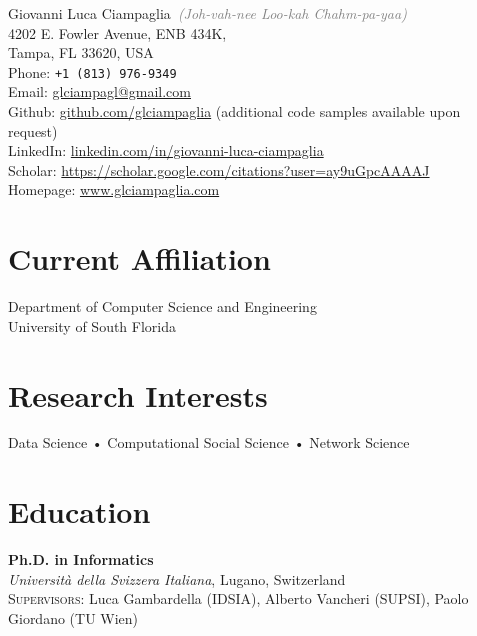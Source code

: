 \documentclass[10pt, letterpaper]{article}
\newcommand{\years}[1]{\marginnote{\small #1}}
\begin{document}
{\LARGE Giovanni Luca Ciampaglia}~\textcolor{gray}{\emph{(Joh-vah-nee Loo-kah Chahm-pa-yaa)}}\\[.75cm]
4202 E. Fowler Avenue, ENB 434K, \\
Tampa, FL 33620, USA\\
Phone: \texttt{+1 (813) 976-9349}\\[.2cm]
Email: \href{mailto:gciampag@indiana.edu}{glciampagl@gmail.com}\\
Github: \href{http://github.com/glciampaglia}{github.com/glciampaglia} (additional code samples available upon request)\\ 
LinkedIn: \href{http://linkedin.com/in/giovanni-luca-ciampaglia}{linkedin.com/in/giovanni-luca-ciampaglia}\\
Scholar: \href{https://scholar.google.com/citations?user=ay9uGpcAAAAJ}{https://scholar.google.com/citations?user=ay9uGpcAAAAJ}\\
Homepage: \href{http://www.glciampaglia.com/}{www.glciampaglia.com}\\

\section*{Current Affiliation}

Department of Computer Science and Engineering\\
University of South Florida

\section*{Research Interests}
Data Science • Computational Social Science • Network Science


\section*{Education}
\noindent

\years{2012}\textbf{Ph.D. in Informatics}\\
%
\textsl{Università della Svizzera Italiana}, Lugano, Switzerland\\
%
\textsc{Supervisors}: Luca Gambardella (IDSIA), Alberto Vancheri (SUPSI), Paolo
Giordano (TU Wien)\\[1em]
\end{document}
